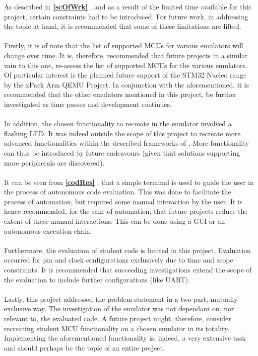 As described in \textbf{\ref{scOfWrk} }, and as a result of the limited time available for this project, certain constraints had to be introduced. For future work, in addressing the topic at hand, it is recommended that some of these limitations are lifted. 
\\\\
Firstly, it is of note that the list of supported MCUs for various emulators will change over time. It is, therefore, recommended that future projects in a similar vain to this one, re-assess the list of supported MCUs for the various emulators. Of particular interest is the planned future support of the STM32 Nucleo range by the xPack Arm QEMU Project. In conjunction with the aforementioned, it is recommended that the other emulators mentioned in this project, be further investigated as time passes and development continues.
\\\\
In addition, the chosen functionality to recreate in the emulator involved a flashing LED. It was indeed outside the scope of this project to recreate more advanced functionalities within the described frameworks of \textbf{}. More functionality can thus be introduced by future endeavours (given that solutions supporting more peripherals are discovered).
\\\\
It can be seen from \textbf{\ref{codRes} }, that a simple terminal is used to guide the user in the process of autonomous code evaluation. This was done to facilitate the process of automation, but required some manual interaction by the user. It is hence recommended, for the sake of automation, that future projects reduce the extent of these manual interactions. This can be done using a GUI or an autonomous execution chain.
\\\\
Furthermore, the evaluation of student code is limited in this project. Evaluation occurred for pin and clock configurations exclusively due to time and scope constraints. It is recommended that succeeding investigations extend the scope of the evaluation to include further configurations (like UART). 
\\\\
Lastly, this project addressed the problem statement in a two-part, mutually exclusive way. The investigation of the emulator was not dependant on, nor relevant to, the evaluated code. A future project might, therefore, consider recreating student MCU functionality on a chosen emulator in its totality. Implementing the aforementioned functionality is, indeed, a very extensive task and should perhaps be the topic of an entire project.


